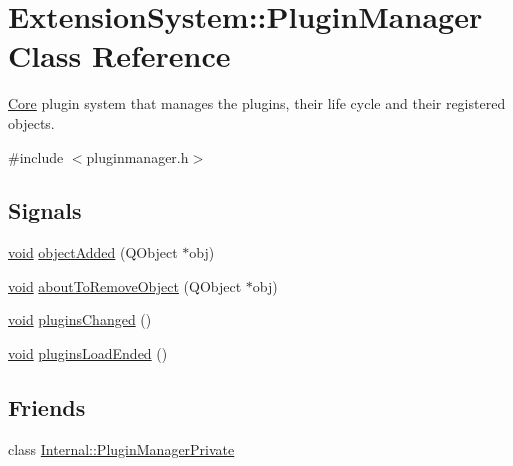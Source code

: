 \hypertarget{class_extension_system_1_1_plugin_manager}{\section{\-Extension\-System\-:\-:\-Plugin\-Manager \-Class \-Reference}
\label{class_extension_system_1_1_plugin_manager}
}


\hyperlink{namespace_core}{\-Core} plugin system that manages the plugins, their life cycle and their registered objects.  




{\ttfamily \#include $<$pluginmanager.\-h$>$}

\subsection*{\-Signals}
\begin{DoxyCompactItemize}
\item 
\hyperlink{group___u_a_v_objects_plugin_ga444cf2ff3f0ecbe028adce838d373f5c}{void} \hyperlink{class_extension_system_1_1_plugin_manager_a6b4756c3e225d230d653fc4b17e75333}{object\-Added} (\-Q\-Object $\ast$obj)
\item 
\hyperlink{group___u_a_v_objects_plugin_ga444cf2ff3f0ecbe028adce838d373f5c}{void} \hyperlink{class_extension_system_1_1_plugin_manager_ad8bb981cb3c0d59af87244cdc5807d35}{about\-To\-Remove\-Object} (\-Q\-Object $\ast$obj)
\item 
\hyperlink{group___u_a_v_objects_plugin_ga444cf2ff3f0ecbe028adce838d373f5c}{void} \hyperlink{class_extension_system_1_1_plugin_manager_ae3beea101f4f0ade4bef0a2ba0995ebc}{plugins\-Changed} ()
\item 
\hyperlink{group___u_a_v_objects_plugin_ga444cf2ff3f0ecbe028adce838d373f5c}{void} \hyperlink{class_extension_system_1_1_plugin_manager_afb03a4a58ac4629332ca26b4eb519748}{plugins\-Load\-Ended} ()
\end{DoxyCompactItemize}
\subsection*{\-Friends}
\begin{DoxyCompactItemize}
\item 
class \hyperlink{class_extension_system_1_1_plugin_manager_ac886620628a69def5b6d57fa12c39179}{\-Internal\-::\-Plugin\-Manager\-Private}
\end{DoxyCompactItemize}


